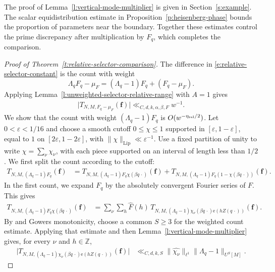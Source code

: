 \documentclass[12pt]{amsart}
\newcommand{\1}{\mathbf 1}
\newcommand{\e}{\mathrm e}
\theoremstyle{definition}
\begin{document}
The proof of Lemma~\ref{l:vertical-mode-multiplier} is given in
Section~\ref{s:example}. The scalar equidistribution estimate in
Proposition~\ref{p:heisenberg-phase} bounds the proportion of
parameters near the boundary. Together these estimates control
the prime discrepancy after multiplication by \(F_q\), which
completes the comparison.

\begin{proof}[Proof of Theorem~\ref{t:relative-selector-comparison}]
 The difference in
\eqref{e:relative-selector-constant} is the count with weight
\[
 \Lambda_qF_q-\mu_F=(\Lambda_q-1)F_q+(F_q-\mu_F).
\]
Applying Lemma~\ref{l:unweighted-selector-relative-range} with
\(A=1\) gives
\begin{align}\label{e:f-muf}
    \bigl|T_{N,M,F_q-\mu_F}(\mathbf f)\bigr|
 \ll_{C,d,k,\alpha,\beta,F} w^{-1}.
\end{align}
We show that the count
with weight \((\Lambda_q-1)F_q\) is \(O(w^{-\eta_{\rm rel}/2})\).
Let \(0<\varepsilon<1/16\) and choose a smooth cutoff
\(0\le\chi\le1\) supported in \([\varepsilon,1-\varepsilon]\),
equal to \(1\) on \([2\varepsilon,1-2\varepsilon]\), with
\(\|\chi\|_{\mathrm{Lip}}\ll\varepsilon^{-1}\). Use a fixed
partition of unity to write \(\chi=\sum_\nu\chi_\nu\), with each
piece supported on an interval of length less than \(1/2\).
We first split the count according to the cutoff:
\begin{align}\label{e:firstsecondterms}
 T_{N,M,(\Lambda_q-1)F_q}(\mathbf f)
 &=T_{N,M,(\Lambda_q-1)F_q\chi(\beta q\,\cdot)}(\mathbf f)+T_{N,M,(\Lambda_q-1)F_q(1-\chi(\beta q\,\cdot))}
   (\mathbf f).
\end{align}
In the first count, we expand \(F_q\) by the absolutely convergent
Fourier series of \(F\). This gives
\[
\begin{aligned}
 T_{N,M,(\Lambda_q-1)F_q\chi(\beta q\,\cdot)}(\mathbf f)
 &=\sum_\nu\sum_{h}\widehat F(h)\,
   T_{N,M,(\Lambda_q-1)\chi_\nu(\beta q\,\cdot)
     \e(hZ(q\,\cdot))}(\mathbf f).
\end{aligned}
\]
By \cite[Proposition~3.3]{KMTT} and Gowers monotonicity, choose a
common \(S\ge3\) for the weighted count estimate. Applying that
estimate and then Lemma~\ref{l:vertical-mode-multiplier} gives,
for every \(\nu\) and \(h\in\mathbb Z\),
\begin{equation}\label{e:high-order-gvn}
\begin{aligned}
 \bigl|T_{N,M,(\Lambda_q-1)\chi_\nu(\beta q\,\cdot)
                  \e(hZ(q\,\cdot))}(\mathbf f)\bigr|&\ll_{C,d,k,S}
 \|\widehat{\chi_\nu}\|_{\ell^1}\|\Lambda_q-1\|_{U^S[M]}.

\end{aligned}
\end{equation}
\end{proof}
\end{document}
